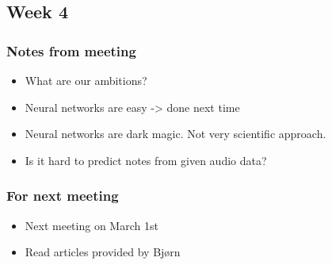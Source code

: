 
\subsection{Week 4}

\subsubsection{Notes from meeting}

\begin{itemize}
\item What are our ambitions?
\item Neural networks are easy -> done next time
\item Neural networks are dark magic. Not very scientific approach.
\item Is it hard to predict notes from given audio data?
\end{itemize}

\subsubsection{For next meeting}

\begin{itemize}
\item Next meeting on March 1st
\item Read articles provided by Bjørn
\end{itemize}
